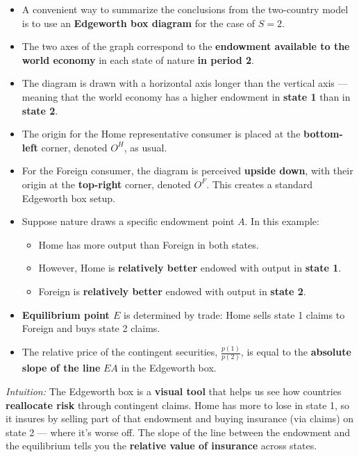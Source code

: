 \documentclass[12pt]{article}
\begin{document}
\begin{itemize}
    \item A convenient way to summarize the conclusions from the two-country model is to use an \textbf{Edgeworth box diagram} for the case of \( S = 2 \).
    
    \item The two axes of the graph correspond to the \textbf{endowment available to the world economy} in each state of nature \textbf{in period 2}.
    
    \item The diagram is drawn with a horizontal axis longer than the vertical axis — meaning that the world economy has a higher endowment in \textbf{state 1} than in \textbf{state 2}.
    
    \item The origin for the Home representative consumer is placed at the \textbf{bottom-left} corner, denoted \( O^H \), as usual.
    
    \item For the Foreign consumer, the diagram is perceived \textbf{upside down}, with their origin at the \textbf{top-right} corner, denoted \( O^F \). This creates a standard Edgeworth box setup.
    
    \item Suppose nature draws a specific endowment point \( A \). In this example:
    \begin{itemize}
        \item Home has more output than Foreign in both states.
        \item However, Home is \textbf{relatively better} endowed with output in \textbf{state 1}.
        \item Foreign is \textbf{relatively better} endowed with output in \textbf{state 2}.
    \end{itemize}
    
    \item \textbf{Equilibrium point \( E \)} is determined by trade: Home sells state 1 claims to Foreign and buys state 2 claims.
    
    \item The relative price of the contingent securities, \( \frac{p(1)}{p(2)} \), is equal to the \textbf{absolute slope of the line} \( EA \) in the Edgeworth box.
\end{itemize}

\vspace{0.5em}

\textit{Intuition:} The Edgeworth box is a \textbf{visual tool} that helps us see how countries \textbf{reallocate risk} through contingent claims. Home has more to lose in state 1, so it insures by selling part of that endowment and buying insurance (via claims) on state 2 — where it's worse off. The slope of the line between the endowment and the equilibrium tells you the \textbf{relative value of insurance} across states.
\end{document}
